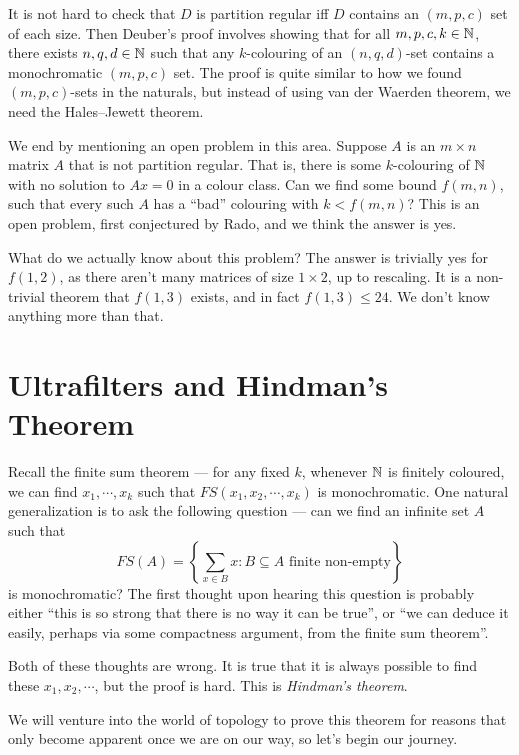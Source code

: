 \documentclass[a4paper]{article}
\begin{document}
It is not hard to check that $D$ is partition regular iff $D$ contains an $(m, p, c)$ set of each size. Then Deuber's proof involves showing that for all $m, p, c, k \in \mathbb{N}$, there exists $n, q, d \in \mathbb{N} $ such that any $k$-colouring of an $(n, q, d)$-set contains a monochromatic $(m, p, c)$ set. The proof is quite similar to how we found $(m, p, c)$-sets in the naturals, but instead of using van der Waerden theorem, we need the Hales--Jewett theorem.

\separator

We end by mentioning an open problem in this area. Suppose $A$ is an $m \times n $ matrix $A$ that is not partition regular. That is, there is some $k$-colouring of $\mathbb{N}$ with no solution to $Ax = 0$ in a colour class. Can we find some bound $f(m, n)$, such that every such $A$ has a ``bad'' colouring with $k < f(m, n)$? This is an open problem, first conjectured by Rado, and we think the answer is yes.

What do we actually know about this problem? The answer is trivially yes for $f(1, 2)$, as there aren't many matrices of size $1 \times 2$, up to rescaling. It is a non-trivial theorem that $f(1, 3)$ exists, and in fact $f(1, 3) \leq 24$. We don't know anything more than that.

\section{Ultrafilters and Hindman's Theorem}
Recall the finite sum theorem --- for any fixed $k$, whenever $\mathbb{N}$ is finitely coloured, we can find $x_1, \cdots, x_k$ such that $FS(x_1, x_2, \cdots, x_k)$ is monochromatic. One natural generalization is to ask the following question --- can we find an infinite set $A$ such that
\[
  FS(A) = \left\{\sum_{x \in B} x : B \subseteq A\text{ finite non-empty}\right\}
\]
is monochromatic? The first thought upon hearing this question is probably either ``this is so strong that there is no way it can be true'', or ``we can deduce it easily, perhaps via some compactness argument, from the finite sum theorem''.

Both of these thoughts are wrong. It is true that it is always possible to find these $x_1, x_2, \cdots$, but the proof is hard. This is \emph{Hindman's theorem}.

We will venture into the world of topology to prove this theorem for reasons that only become apparent once we are on our way, so let's begin our journey.

\printindex
\end{document}
